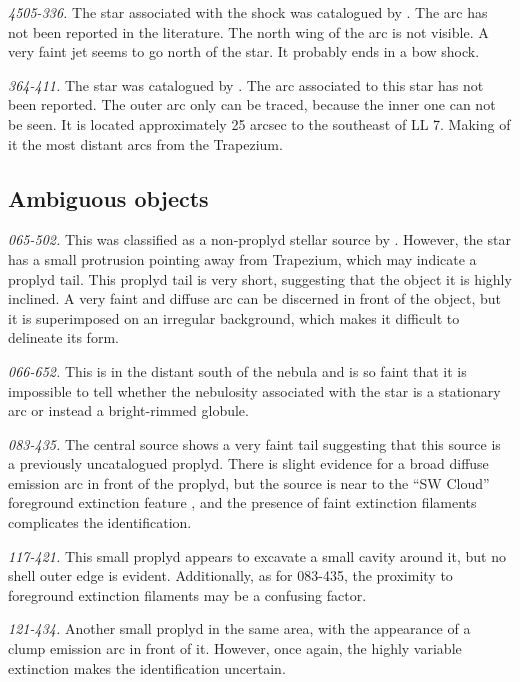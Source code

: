 \documentclass[iop, apj]{emulateapj}
\renewcommand\clearpage{}
\begin{document}
\textit{4505-336.} The star associated with the shock was catalogued by \citet{Hillenbrand:1997}. The arc has not been reported in the literature.  The north wing of the arc is not visible. A very faint jet seems to go north of the star. It probably ends in a bow shock.    

\textit{364-411.} The star was catalogued by \citet{Hillenbrand:1997}. The arc associated to this star has not been reported. The outer arc only can be traced, because the inner one can not be seen. It is located approximately 25 arcsec to the southeast of LL 7. Making of it the most distant arcs from the Trapezium. 

\clearpage
\subsection{Ambiguous objects}
\label{sec:problematic-objects}

\textit{065-502.} This was classified as a non-proplyd stellar source
by \citet{ODell:1996a}. However, the star has a small protrusion
pointing away from Trapezium, which may indicate a proplyd tail. This
proplyd tail is very short, suggesting that the object it is highly
inclined.  A very faint and diffuse arc can be discerned in front of
the object, but it is superimposed on an irregular background, which
makes it difficult to delineate its form.

\textit{066-652.}  This is in the distant south of the nebula and is
so faint that it is impossible to tell whether the nebulosity
associated with the star is a stationary arc or instead a
bright-rimmed globule. 

\textit{083-435.} The central source shows a very faint tail
suggesting that this source is a previously uncatalogued proplyd.
There is slight evidence for a broad diffuse emission arc in front of
the proplyd, but the source is near to the ``SW Cloud'' foreground
extinction feature \citep{ODell:2000a}, and the presence of faint
extinction filaments complicates the identification.


\textit{117-421.} This small proplyd \citep{Ricci:2008a} appears to
excavate a small cavity around it, but no shell outer edge is
evident.  Additionally, as for 083-435, the proximity to foreground
extinction filaments may be a confusing factor. 

\textit{121-434.}  Another small proplyd in the same area, with the
appearance of a clump emission arc in front of it.  However, once
again, the highly variable extinction makes the identification
uncertain. 
\end{document}
